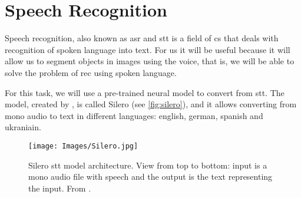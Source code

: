 \section{Speech Recognition}%
\label{sec:speech}

Speech recognition, also known as \gls{asr} and \gls{stt} is a field of
\gls{cs} that deals with recognition of spoken language into text. For us it
will be useful because it will allow us to segment objects in images using the
voice, that is, we will be able to solve the problem of \gls{rec} using spoken
language.

For this task, we will use a pre-trained neural model to convert from
\gls{stt}. The model, created by
, is called Silero (see
\vref{fig:silero}), and it allows converting from mono audio to text in
different languages: english, german, spanish and ukraniain.

\begin{figure}[p]
  \centering
  \texttt{[image: Images/Silero.jpg]}
  \caption[Silero  model architecture]{Silero \acf{stt} model
    architecture. View from top to bottom: input is a mono audio file with
    speech and the output is the text representing the input. From
    .}\label{fig:silero}
\end{figure}

